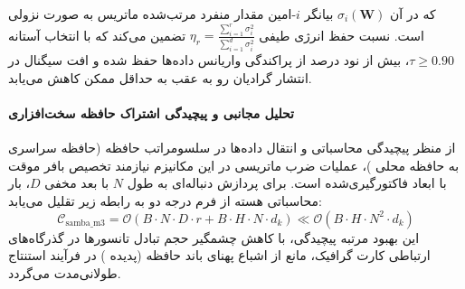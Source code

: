 که در آن $\sigma_i(\mathbf{W})$ بیانگر $i$-امین مقدار منفرد مرتب‌شده ماتریس به صورت نزولی است. نسبت حفظ انرژی طیفی $\eta_r = \frac{\sum_{i=1}^r \sigma_i^2}{\sum_{i=1}^{d} \sigma_i^2}$ تضمین می‌کند که با انتخاب آستانه $\tau \ge 0.90$، بیش از نود درصد از پراکندگی واریانس داده‌ها حفظ شده و افت سیگنال در انتشار گرادیان رو به عقب به حداقل ممکن کاهش می‌یابد.

\paragraph{تحلیل مجانبی و پیچیدگی اشتراک حافظه سخت‌افزاری}
از منظر پیچیدگی محاسباتی و انتقال داده‌ها در سلسومراتب حافظه (حافظه سراسری  به حافظه محلی )، عملیات ضرب ماتریسی در این مکانیزم نیازمند تخصیص بافر موقت با ابعاد فاکتورگیری‌شده است. برای پردازش دنباله‌ای به طول $N$ با بعد مخفی $D$، بار محاسباتی هسته از فرم درجه دو به رابطه زیر تقلیل می‌یابد:
\begin{equation}
\label{eq:complexity_samba_m3}
\mathcal{C}_{\text{samba\_m3}} = \mathcal{O}\left( B \cdot N \cdot D \cdot r + B \cdot H \cdot N \cdot d_k \right) \ll \mathcal{O}\left( B \cdot H \cdot N^2 \cdot d_k \right)
\end{equation}
این بهبود مرتبه پیچیدگی، با کاهش چشمگیر حجم تبادل تانسورها در گذرگاه‌های ارتباطی کارت گرافیک، مانع از اشباع پهنای باند حافظه (پدیده ) در فرآیند استنتاج طولانی‌مدت می‌گردد.
